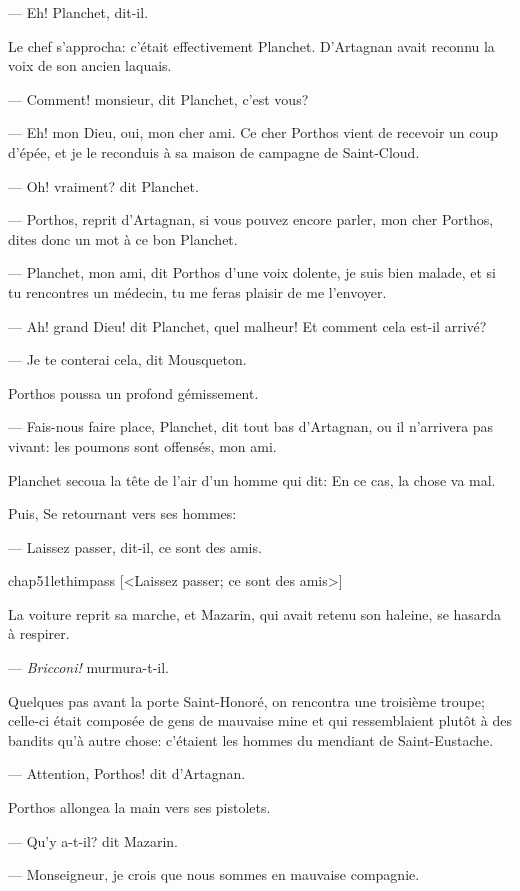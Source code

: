 — Eh! Planchet, dit-il.

Le chef s'approcha: c'était effectivement Planchet. D'Artagnan avait reconnu la voix de son ancien laquais.

— Comment! monsieur, dit Planchet, c'est vous?

— Eh! mon Dieu, oui, mon cher ami. Ce cher Porthos vient de recevoir un coup d'épée, et je le reconduis à sa maison de campagne de Saint-Cloud.

— Oh! vraiment? dit Planchet.

— Porthos, reprit d'Artagnan, si vous pouvez encore parler, mon cher Porthos, dites donc un mot à ce bon Planchet.

— Planchet, mon ami, dit Porthos d'une voix dolente, je suis bien malade, et si tu rencontres un médecin, tu me feras plaisir de me l'envoyer.

— Ah! grand Dieu! dit Planchet, quel malheur! Et comment cela est-il arrivé?

— Je te conterai cela, dit Mousqueton.

Porthos poussa un profond gémissement.

— Fais-nous faire place, Planchet, dit tout bas d'Artagnan, ou il n'arrivera pas vivant: les poumons sont offensés, mon ami.

Planchet secoua la tête de l'air d'un homme qui dit: En ce cas, la chose va mal.

Puis, Se retournant vers ses hommes:

— Laissez passer, dit-il, ce sont des amis.

\begin{bwbigpic}
	[\basicscale] 
	{chap51lethimpass}
	[<Laissez passer; ce sont des amis>]
\end{bwbigpic}

La voiture reprit sa marche, et Mazarin, qui avait retenu son haleine, se hasarda à respirer.

— \textit{Bricconi!} murmura-t-il.

Quelques pas avant la porte Saint-Honoré, on rencontra une troisième troupe; celle-ci était composée de gens de mauvaise mine et qui ressemblaient plutôt à des bandits qu'à autre chose: c'étaient les hommes du mendiant de Saint-Eustache.

— Attention, Porthos! dit d'Artagnan.

Porthos allongea la main vers ses pistolets.

— Qu'y a-t-il? dit Mazarin.

— Monseigneur, je crois que nous sommes en mauvaise compagnie.

